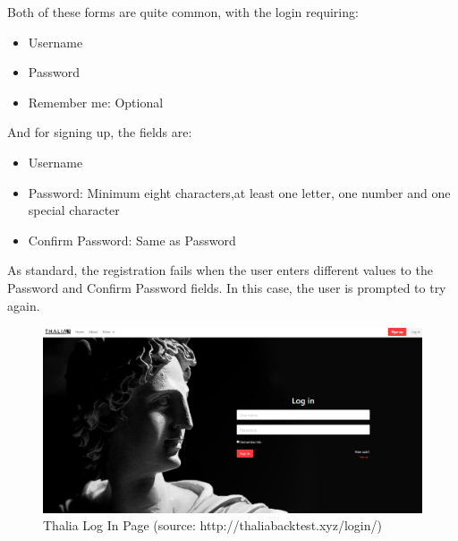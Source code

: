 \documentclass[main.tex]{subfiles}
\begin{document}
Both of these forms are quite common, with the login requiring:



\begin{itemize}

    \item Username

    \item Password

    \item Remember me: Optional

\end{itemize}



And for signing up, the fields are:



\begin{itemize}

    \item Username

    \item Password: Minimum eight characters,at least one letter, one number and one special character

    \item Confirm Password: Same as Password

\end{itemize}



As standard, the registration fails when the user enters different values to the Password and Confirm Password fields. In this case, the user is prompted to try again.



\begin{figure}[H]

   \centering

   \includegraphics[width=\textwidth]{08Appendices/081User/081Pictures/login.png}

   \caption{Thalia Log In Page (source: http://thaliabacktest.xyz/login/)}

   \label{thalia_login}

\end{figure}
\end{document}
